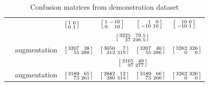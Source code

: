 \documentclass[a4paper,12pt,%
onecolumn,oneside,article,%
british%
]{memoir}
\renewcommand*{\|}[1][]{\nonscript\:#1\vert\nonscript\:\mathopen{}}
\newcommand*{\sumatrix}[4]{\begin{bsmallmatrix*}[r]#1&#2\\#3&#4\end{bsmallmatrix*}}
\begin{document}
%
\begin{table}[!p]
  \centering
  \small
  \begin{tabular*}{\linewidth}{clw{c}{0.12\linewidth}w{c}{0.12\linewidth}w{c}{0.12\linewidth}w{c}{0.12\linewidth}}
&    &$\sumatrix{1}{0}{0}{1}$
 &$\sumatrix{1}{-10}{0}{10}$
 &$\sumatrix{1}{0}{-10}{10}$
 &$\sumatrix{10}{0}{-10}{1}$
    \\[4\jot]
 &\parbox{0.21\linewidth}{\color{red}}
 &\multicolumn{4}{c}{\textcolor{red}{$\sumatrix{3225}{79.5}{37}{246.5}$}}
 \\[2\jot]
 &\parbox{0.21\linewidth}{\color{blue}augmentation}
 &\textcolor{blue}{$\sumatrix{3207}{38}{55}{288}$}
 &\textcolor{blue}{$\sumatrix{3050}{7}{212}{319}$}
 &\textcolor{blue}{$\sumatrix{3207}{40}{55}{286}$}
 &\textcolor{blue}{$\sumatrix{3262}{326}{0}{0}$}
 \\[6\jot]
 &\parbox{0.21\linewidth}{\color{red}}
 &\multicolumn{4}{c}{\textcolor{red}{$\sumatrix{3165}{49}{97}{277}$}}
 \\[2\jot]
 &\parbox{0.21\linewidth}{\color{blue} augmentation}
 &\textcolor{blue}{$\sumatrix{3189}{65}{73}{261}$}
 &\textcolor{blue}{$\sumatrix{2882}{12}{380}{314}$}
 &\textcolor{blue}{$\sumatrix{3189}{66}{73}{260}$}
 &\textcolor{blue}{$\sumatrix{3262}{326}{0}{0}$}
 \end{tabular*}
  \\[1em]
  \caption{Confusion matrices from demonstration dataset}
  \label{tab:results_CM}

\vspace{6em}
  

\end{table}
\end{document}
